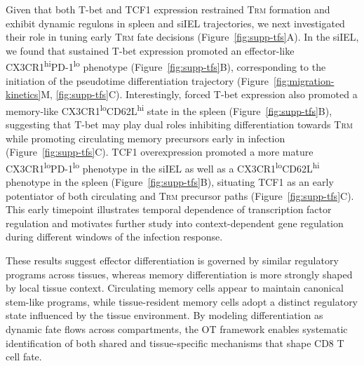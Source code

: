 Given that both T-bet and TCF1 expression restrained T\textsc{rm} formation and exhibit dynamic regulons in spleen and siIEL trajectories, we next investigated their role in tuning early T\textsc{rm} fate decisions (Figure~\ref{fig:supp-tfs}A). In the siIEL, we found that sustained T-bet expression promoted an effector-like CX3CR1\textsuperscript{hi}PD-1\textsuperscript{lo} phenotype (Figure~\ref{fig:supp-tfs}B), corresponding to the initiation of the pseudotime differentiation trajectory (Figure~\ref{fig:migration-kinetics}M, \ref{fig:supp-tfs}C). Interestingly, forced T-bet expression also promoted a memory-like CX3CR1\textsuperscript{lo}CD62L\textsuperscript{hi} state in the spleen (Figure~\ref{fig:supp-tfs}B), suggesting that T-bet may play dual roles inhibiting differentiation towards T\textsc{rm} while promoting circulating memory precursors early in infection (Figure~\ref{fig:supp-tfs}C). TCF1 overexpression promoted a more mature CX3CR1\textsuperscript{lo}PD-1\textsuperscript{lo} phenotype in the siIEL as well as a CX3CR1\textsuperscript{lo}CD62L\textsuperscript{hi} phenotype in the spleen (Figure~\ref{fig:supp-tfs}B), situating TCF1 as an early potentiator of both circulating and T\textsc{rm} precursor paths (Figure~\ref{fig:supp-tfs}C). This early timepoint illustrates temporal dependence of transcription factor regulation and motivates further study into context-dependent gene regulation during different windows of the infection response.

These results suggest effector differentiation is governed by similar regulatory programs across tissues, whereas memory differentiation is more strongly shaped by local tissue context. Circulating memory cells appear to maintain canonical stem-like programs, while tissue-resident memory cells adopt a distinct regulatory state influenced by the tissue environment. By modeling differentiation as dynamic fate flows across compartments, the OT framework enables systematic identification of both shared and tissue-specific mechanisms that shape CD8 T cell fate.

